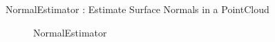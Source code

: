 \documentclass[main.tex]{subfiles}
\begin{document}
\begin{itemize}
	\begin{minipage}[t]{\textwidth}
	\item NormalEstimator : Estimate Surface Normals in a PointCloud 
		\begin{figure}[H]
   			 \centering
   			 \caption{NormalEstimator}
  		\end{figure}
	\end{minipage}


\end{itemize}
\end{document}
